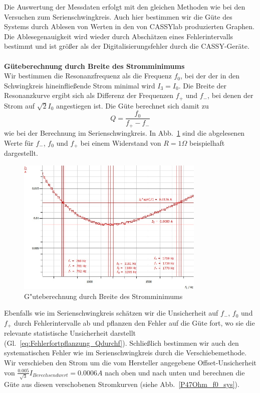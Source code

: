 \documentclass[12pt,a4paper]{article}
\begin{document}
Die Auswertung der Messdaten erfolgt mit den gleichen Methoden wie bei den Versuchen zum Serienschwingkreis. Auch hier bestimmen wir die Güte des Systems durch Ablesen von Werten in den von CASSYlab produzierten Graphen. Die Ablesegenauigkeit wird wieder durch Abschätzen eines Fehlerintervalls bestimmt und ist größer als der Digitalisierungsfehler durch die CASSY-Geräte.\\
\\
\textbf{Güteberechnung durch Breite des Stromminimums}\\
Wir bestimmen die Resonanzfrequenz als die Frequenz $f_0$, bei der der in den Schwingkreis hineinfließende Strom  minimal wird $I_3=I_0$. Die Breite der Resonanzkurve ergibt sich als Differenz der Frequenzen $f_+$ und $f_-$, bei denen der Strom auf $\sqrt{2}I_0$ angestiegen ist. Die Güte berechnet sich damit zu
\begin{equation}\label{eq:guete_ueber_f}
Q=\frac{f_0}{f_+-f_-}
\end{equation}
wie bei der Berechnung im Serienschwingkreis. In Abb.~\ref{P47Ohm_f0} sind die abgelesenen Werte für $f_-$, $f_0$ und $f_+$ bei einem Widerstand von $R=1\Omega$ beispielhaft dargestellt.
\begin{figure}[H]
	\centering
	\includegraphics[width=0.8\textwidth]{Daten/P47Ohm_f0.jpg}
	\caption{G"uteberechnung durch Breite des Stromminimums}
	\label{P47Ohm_f0}
\end{figure}
Ebenfalls wie im Serienschwingkreis schätzen wir die Unsicherheit auf $f_-$, $f_0$ und $f_+$ durch Fehlerintervalle ab und pflanzen den Fehler auf die Güte fort, wo sie die relevante statistische Unsicherheit darstellt (Gl.~\eqref{eq:Fehlerfortpflanzung_Qdurchf}). Schließlich bestimmen wir auch den systematischen Fehler wie im Serienschwingkreis durch die Verschiebemethode. Wir verschieben den Strom um die vom Hersteller angegebene Offset-Unsicherheit von $\frac{0.005}{\sqrt{3}}I_{Berechsendwert}=0.0006A$ nach oben und nach unten und berechnen die Güte aus diesen verschobenen Stromkurven (siehe Abb.~\ref{P47Ohm_f0_sys}).
\end{document}

